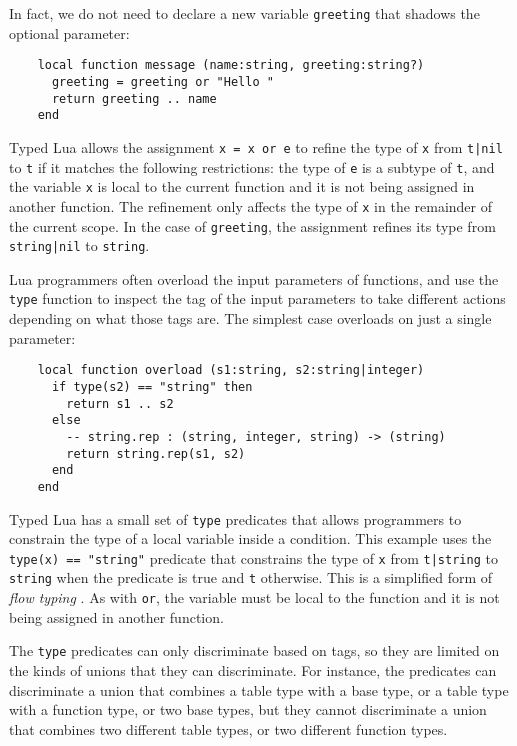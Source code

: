 In fact, we do not need to declare a new variable \texttt{greeting} that
shadows the optional parameter:
\begin{verbatim}
    local function message (name:string, greeting:string?)
      greeting = greeting or "Hello "
      return greeting .. name
    end
\end{verbatim}

Typed Lua allows the assignment \texttt{x = x or e} to refine
the type of \texttt{x} from \texttt{t|nil} to \texttt{t}
if it matches the following restrictions: 
the type of \texttt{e} is a subtype of \texttt{t},
and the variable \texttt{x} is local to the current function
and it is not being assigned in another function.
The refinement only affects the type of \texttt{x} in the remainder
of the current scope.
In the case of \texttt{greeting}, the assignment refines its type
from \texttt{string|nil} to \texttt{string}. 

Lua programmers often overload the input parameters of functions,
and use the \texttt{type} function to inspect the tag of the
input parameters to take different actions depending on what
those tags are.
The simplest case overloads on just a single parameter:
\begin{verbatim}
    local function overload (s1:string, s2:string|integer)
      if type(s2) == "string" then
        return s1 .. s2
      else
        -- string.rep : (string, integer, string) -> (string)
        return string.rep(s1, s2)
      end
    end
\end{verbatim}

Typed Lua has a small set of \texttt{type} predicates that allows
programmers to constrain the type of a local variable inside a condition.
This example uses the \texttt{type(x) == "string"} predicate that
constrains the type of \texttt{x} from \texttt{t|string} to
\texttt{string} when the predicate is true and \texttt{t} otherwise.
This is a simplified form of \emph{flow typing} \citep{guha2011tlc,tobin-hochstadt2010ltu}.
As with \texttt{or}, the variable must be local to the function
and it is not being assigned in another function.

The \texttt{type} predicates can only discriminate based on tags,
so they are limited on the kinds of unions that they can discriminate.
For instance, the predicates can discriminate a union that combines
a table type with a base type, or a table type with a function type,
or two base types, but they cannot discriminate a union that combines
two different table types, or two different function types.

